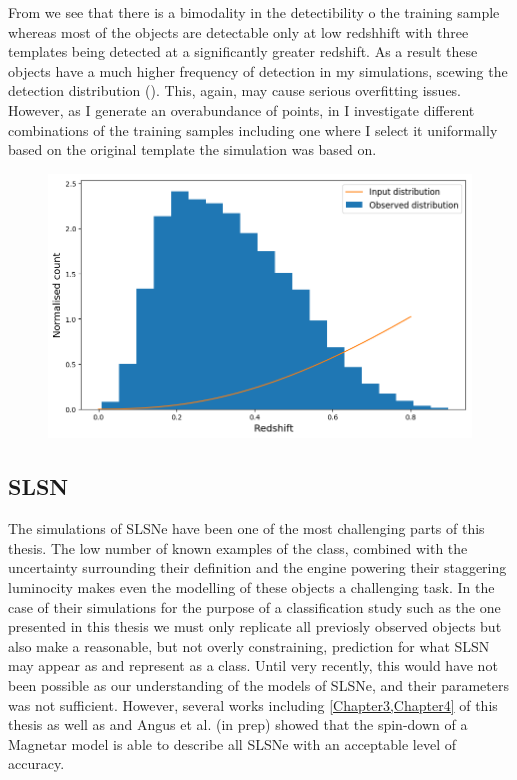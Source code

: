 From  we see that there is a bimodality in the detectibility o the training sample whereas most of the objects are detectable only at low redshhift with three templates being detected at a significantly greater redshift. As a result these objects have a much higher frequency of detection in my simulations, scewing the detection distribution (). This, again, may cause serious overfitting issues. However, as I generate an overabundance of points, in  I investigate different combinations of the training samples including one where I select it uniformally based on the original template the simulation was based on.

\begin{figure}
  \includegraphics{Figures/Chapter5/SNII_z_dist.png}
  \caption{}
  \label{fig:IIDist}
\end{figure}

\subsection{SLSN}
The simulations of SLSNe have been one of the most challenging parts of this thesis. The low number of known examples of the class, combined with the uncertainty surrounding their definition and the engine powering their staggering luminocity makes even the modelling of these objects a challenging task. In the case of their simulations for the purpose of a classification study such as the one presented in this thesis we must only replicate all previosly observed objects but also make a reasonable, but not overly constraining, prediction for what SLSN may appear as and represent as a class. Until very recently, this would have not been possible as our understanding of the models of SLSNe, and their parameters was not sufficient. However, several works including \cref{Chapter3,Chapter4} of this thesis as well as \citet{Inserra2013,Nicoll2013,Nicoll2017} and Angus et al. (in prep) showed that the spin-down of a Magnetar model is able to describe all SLSNe with an acceptable level of accuracy.

